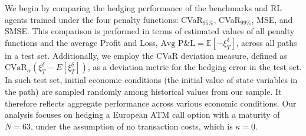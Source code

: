 \documentclass[12pt]{article}
\begin{document}
We begin by comparing the hedging performance of the benchmarks and RL agents trained under the four penalty functions: CVaR$_{95\%}$, CVaR$_{99\%}$, MSE, and SMSE. This comparison is performed in terms of estimated values of all penalty functions and the average Profit and Loss, $\mbox{Avg P\&L} = \mathbb{E}[ -\xi_{T}^{\delta}]$, across all paths in a test set. Additionally, we employ the CVaR deviation measure, defined as $\mbox{CVaR}_{\alpha}(\xi_{T}^{\delta} - E[\xi_{T}^{\delta}])$, as a deviation metric for the hedging error in the test set. In such test set, initial economic conditions (the initial value of state variables in the path) are sampled randomly among historical values from our sample. It therefore reflects aggregate performance across various economic conditions.
Our analysis focuses on hedging a European ATM call option with a maturity of $N=63$, under the assumption of no transaction costs, which is $\kappa=0$.
\end{document}
